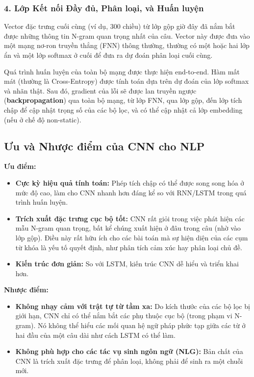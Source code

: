 \subsubsection{4. Lớp Kết nối Đầy đủ, Phân loại, và Huấn luyện}
Vector đặc trưng cuối cùng (ví dụ, 300 chiều) từ lớp gộp giờ đây đã nắm bắt được những thông tin N-gram quan trọng nhất của câu. Vector này được đưa vào một mạng nơ-ron truyền thẳng (FNN) thông thường, thường có một hoặc hai lớp ẩn và một lớp softmax ở cuối để đưa ra dự đoán phân loại cuối cùng.

Quá trình huấn luyện của toàn bộ mạng được thực hiện end-to-end. Hàm mất mát (thường là Cross-Entropy) được tính toán dựa trên dự đoán của lớp softmax và nhãn thật. Sau đó, gradient của lỗi sẽ được lan truyền ngược (\textbf{backpropagation}) qua toàn bộ mạng, từ lớp FNN, qua lớp gộp, đến lớp tích chập để cập nhật trọng số của các bộ lọc, và có thể cập nhật cả lớp embedding (nếu ở chế độ non-static).

\subsection{Ưu và Nhược điểm của CNN cho NLP}
\begin{tcolorbox}[
    title=Đánh giá CNN cho NLP,
    colback=blue!5!white, colframe=blue!50!black, fonttitle=\bfseries
]
\textbf{Ưu điểm:}
\begin{itemize}
    \item \textbf{Cực kỳ hiệu quả tính toán:} Phép tích chập có thể được song song hóa ở mức độ cao, làm cho CNN nhanh hơn đáng kể so với RNN/LSTM trong quá trình huấn luyện.
    \item \textbf{Trích xuất đặc trưng cục bộ tốt:} CNN rất giỏi trong việc phát hiện các mẫu N-gram quan trọng, bất kể chúng xuất hiện ở đâu trong câu (nhờ vào lớp gộp). Điều này rất hữu ích cho các bài toán mà sự hiện diện của các cụm từ khóa là yếu tố quyết định, như phân tích cảm xúc hay phân loại chủ đề.
    \item \textbf{Kiến trúc đơn giản:} So với LSTM, kiến trúc CNN dễ hiểu và triển khai hơn.
\end{itemize}
\textbf{Nhược điểm:}
\begin{itemize}
    \item \textbf{Không nhạy cảm với trật tự từ tầm xa:} Do kích thước của các bộ lọc bị giới hạn, CNN chỉ có thể nắm bắt các phụ thuộc cục bộ (trong phạm vi N-gram). Nó không thể hiểu các mối quan hệ ngữ pháp phức tạp giữa các từ ở hai đầu của một câu dài như cách LSTM có thể làm.
    \item \textbf{Không phù hợp cho các tác vụ sinh ngôn ngữ (NLG):} Bản chất của CNN là trích xuất đặc trưng để phân loại, không phải để sinh ra một chuỗi mới.
\end{itemize}
\end{tcolorbox}
